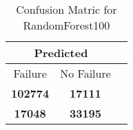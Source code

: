 \begin{table}[] 
\caption{Confusion Matric for RandomForest100} 
\label{Table: Prediction Accuracy-DMDRandomForest100OnlySunEKF-combinationReflectionEKF-top2-Reflection} 
\centering 
\begin{tabular} 
 {@{}ccc@{}} 
\toprule 
\multicolumn{2}{c}{\textbf{Predicted}}
 \\ \midrule 
\multicolumn{1}{|c|}{Failure} & 
\multicolumn{1}{c|}{No Failure}
 \\ \midrule 
\multicolumn{1}{|c|}{\color{green}\textbf{102774}} & 
\multicolumn{1}{c|}{\color{red}\textbf{17111}}
 \\ \midrule 
\multicolumn{1}{|c|}{\color{red}\textbf{17048}} & 
\multicolumn{1}{c|}{\color{green}\textbf{33195}}
 \\ \bottomrule 
\end{tabular} 
\end{table} 
